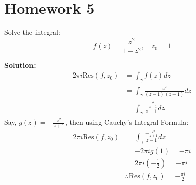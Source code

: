 \chapter{Homework 5} %


\begin{example}
    Solve the integral:
    $$f(z) = \frac{z^2}{1 - z^2}, \quad z_0 = 1$$

    \textbf{Solution:}
    \begin{align*}
        2\pi i \text{Res}(f, z_0) & = \int_{\gamma} f(z) dz                             \\
                                  & = \int_{\gamma} \frac{z^2}{(z - 1)(z + 1)} dz       \\
                                  & = \int_{\gamma} \frac{-\frac{z^2}{z + 1}}{z - 1} dz
    \end{align*}
    Say, $g(z) = -\frac{z^2}{z + 1}$, then using Cauchy's Integral Formula:
    \begin{align*}
        2\pi i \text{Res}(f, z_0) & = \int_{\gamma} \frac{-\frac{z^2}{z + 1}}{z - 1} dz \\
                                  & = -2\pi i g(1) = -\pi i                             \\
                                  & = 2\pi i \left( -\frac{1}{2} \right) = -\pi i       \\
                                  & \therefore \text{Res}(f, z_0) = -\frac{\pi i}{2}
    \end{align*}
\end{example}

